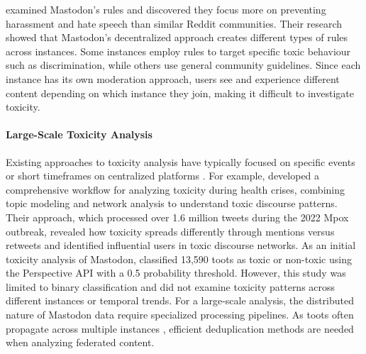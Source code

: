 \citet{nicholson:2023} examined Mastodon's rules and discovered they focus more on preventing harassment and hate speech than similar Reddit communities. Their research showed that Mastodon's decentralized approach creates different types of rules across instances. Some instances employ rules to target specific toxic behaviour such as discrimination, while others use general community guidelines. Since each instance has its own moderation approach, users see and experience different content depending on which instance they join, making it difficult to investigate toxicity.

\paragraph{Large-Scale Toxicity Analysis}
Existing approaches to toxicity analysis have typically focused on specific events or short timeframes on centralized platforms \cite{wulczyn:2017, fan:2022,georgakopoulos:2018,badjatiya:2017}. For example, \citet{fan:2022} developed a comprehensive workflow for analyzing toxicity during health crises, combining topic modeling and network analysis to understand toxic discourse patterns. Their approach, which processed over 1.6 million tweets during the 2022 Mpox outbreak, revealed how toxicity spreads differently through mentions versus retweets and identified influential users in toxic discourse networks. As an initial toxicity analysis of Mastodon, \citet{al-khateeb:2022} classified 13,590 toots as toxic or non-toxic using the Perspective API with a 0.5 probability threshold. However, this study was limited to binary classification and did not examine toxicity patterns across different instances or temporal trends. For a large-scale analysis, the distributed nature of Mastodon data require specialized processing pipelines. As toots often propagate across multiple instances \cite{bono:2024}, efficient deduplication methods are needed when analyzing federated content.